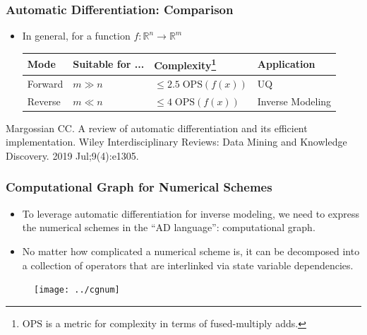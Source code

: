 \documentclass{beamer}
\newcommand{\RR}[0]{\mathbb{R}}
\begin{document}
\begin{frame}
	\frametitle{Automatic Differentiation: Comparison}
	
	\begin{itemize}
			\item In general, for a function $f:\RR^n \rightarrow \RR^m$
\begin{table}[]
\centering
\begin{tabular}{@{}llll@{}}
\toprule
Mode & Suitable for ... & Complexity\footnote{$\mathrm{OPS}$ is a metric for complexity in terms of fused-multiply adds.} & Application \\ \midrule
Forward & $m\gg n$ & $\leq 2.5\;\mathrm{OPS}(f(x))$ & UQ \\
Reverse & $m\ll n$ & $\leq 4\;\mathrm{OPS}(f(x))$ & Inverse Modeling \\ \bottomrule
\end{tabular}
\end{table}
	\end{itemize}
	
		{\footnotesize Margossian CC. A review of automatic differentiation and its efficient implementation. Wiley Interdisciplinary Reviews: Data Mining and Knowledge Discovery. 2019 Jul;9(4):e1305.} 
\end{frame}

\begin{frame}
	\frametitle{Computational Graph for Numerical Schemes}
	
	\begin{itemize}
		\item To leverage automatic differentiation for inverse modeling, we need to express the numerical schemes in the ``AD language'': computational graph. 
		\item No matter how complicated a numerical scheme is, it can be decomposed into a collection of operators that are interlinked via state variable dependencies. 
	\end{itemize}
	
	\begin{figure}[hbt]
  \texttt{[image: ../cgnum]}
\end{figure}

	
	
\end{frame}
\end{document}
